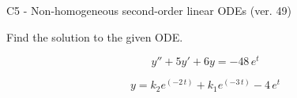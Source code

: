 \begin{exercise}
  \begin{exerciseTitle}C5 - Non-homogeneous second-order linear ODEs (ver. 49)\end{exerciseTitle}
  \begin{exerciseStatement}
    
Find the solution to the given ODE.

    
\[y''+5y'+6y = -48 \, e^{t}\]

  \end{exerciseStatement}
  \begin{exerciseAnswer}
    
\[y= k_{2} e^{\left(-2 \, t\right)} + k_{1} e^{\left(-3 \, t\right)} - 4 \, e^{t}\]

  \end{exerciseAnswer}
\end{exercise}